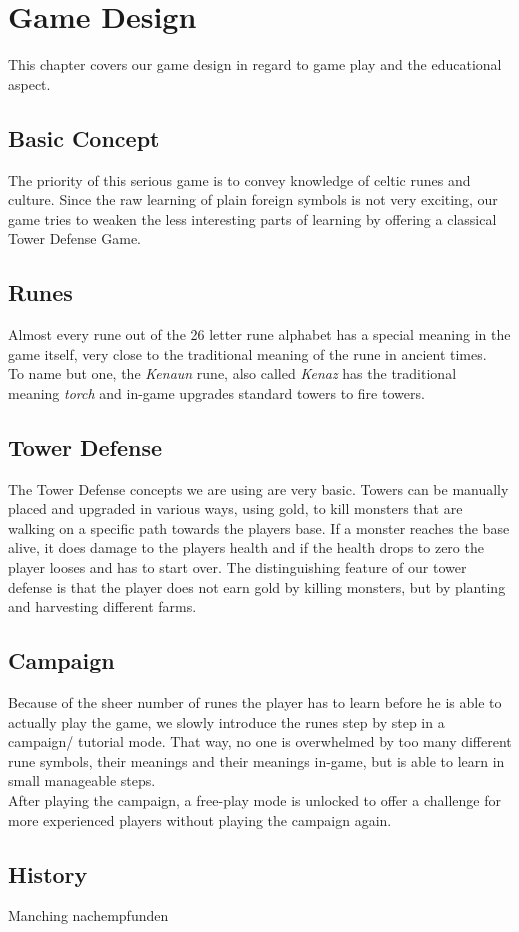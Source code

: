 \section{Game Design}
\label{sec:game_design}

This chapter covers our game design in regard to game play and the educational aspect.

\cite{rieckhoff-celts-in-germany}

\subsection{Basic Concept}
The priority of this serious game is to convey knowledge of celtic runes and culture. 
Since the raw learning of plain foreign symbols is not very exciting, our game tries to weaken the less interesting parts of learning by offering a classical Tower Defense Game.

\subsection{Runes}

Almost every rune out of the 26 letter rune alphabet has a special meaning in the game itself, very close to the traditional meaning of the rune in ancient times.\\
To name but one, the \emph{Kenaun} rune, also called \emph{Kenaz} has the traditional meaning \emph{torch} and in-game upgrades standard towers to fire towers.

\subsection{Tower Defense}

The Tower Defense concepts we are using are very basic. Towers can be manually placed and upgraded in various ways, using gold, to kill monsters that are walking on a specific path towards the players base. If a monster reaches the base alive, it does damage to the players health and if the health drops to zero the player looses and has to start over. 
The distinguishing feature of our tower defense is that the player does not earn gold by killing monsters, but by planting and harvesting different farms.

\subsection{Campaign}

Because of the sheer number of runes the player has to learn before he is able to actually play the game, we slowly introduce the runes step by step in a campaign/ tutorial mode. That way, no one is overwhelmed by too many different rune symbols, their meanings and their meanings in-game, but is able to learn in small manageable steps. \\
After playing the campaign, a free-play mode is unlocked to offer a challenge for more experienced players without playing the campaign again. \\

\subsection{History}



Manching nachempfunden

